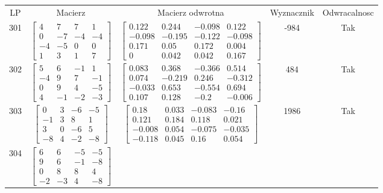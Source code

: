 \documentclass[a4paper,12pt]{article}
\begin{document}
\bgroup {} \vspace{0.2in} \begin{tabular}{c c c c c}
LP & Macierz & Macierz odwrotna & Wyznacznik & Odwracalnosc\\
301
&
$\begin{bmatrix} 4 & 7 & 7 & 1 \\ 0 & -7 & -4 & -4 \\ -4 & -5 & 0 & 0 \\ 1 & 3 & 1 & 7 \end{bmatrix}$
&
$\begin{bmatrix} 0.122 & 0.244 & -0.098 & 0.122 \\ -0.098 & -0.195 & -0.122 & -0.098 \\ 0.171 & 0.05 & 0.172 & 0.004 \\ 0 & 0.042 & 0.042 & 0.167 \end{bmatrix}$
&
-984
&
Tak
\\
302
&
$\begin{bmatrix} 5 & 6 & -1 & 1 \\ -4 & 9 & 7 & -1 \\ 0 & 9 & 4 & -5 \\ 4 & -1 & -2 & -3 \end{bmatrix}$
&
$\begin{bmatrix} 0.083 & 0.368 & -0.366 & 0.514 \\ 0.074 & -0.219 & 0.246 & -0.312 \\ -0.033 & 0.653 & -0.554 & 0.694 \\ 0.107 & 0.128 & -0.2 & -0.006 \end{bmatrix}$
&
484
&
Tak
\\
303
&
$\begin{bmatrix} 0 & 3 & -6 & -5 \\ -1 & 3 & 8 & 1 \\ 3 & 0 & -6 & 5 \\ -8 & 4 & -2 & -8 \end{bmatrix}$
&
$\begin{bmatrix} 0.18 & 0.033 & -0.083 & -0.16 \\ 0.121 & 0.184 & 0.118 & 0.021 \\ -0.008 & 0.054 & -0.075 & -0.035 \\ -0.118 & 0.045 & 0.16 & 0.054 \end{bmatrix}$
&
1986
&
Tak
\\
304
&
$\begin{bmatrix} 6 & 6 & -5 & -5 \\ 9 & 6 & -1 & -8 \\ 0 & 8 & 8 & 4 \\ -2 & -3 & 4 & -8 \end{bmatrix}$

\end{tabular}
\end{document}
